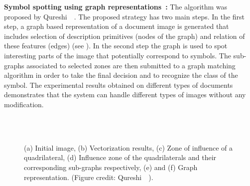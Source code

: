 \textbf{Symbol spotting using graph representations~\cite{Qureshi2007}:} The algorithm was proposed by Qureshi~\etal~\cite{Qureshi2007}. The proposed strategy has two main steps. In the first step, a graph based representation of a document image is generated that includes selection of description primitives (nodes of the graph) and relation of these features (edges) (see ). In the second step the graph is used to spot interesting parts of the image that potentially correspond to symbols. The sub-graphs associated to selected zones are then submitted to a graph matching algorithm in order to take the final decision and to recognize the class of the symbol. The experimental results obtained on different types of documents demonstrates that the system can handle different types of images without any modification.
\begin{figure}[t!]
\begin{center}
\hspace{5mm}
\\
\hspace{2mm}
\hspace{2mm}
\\
\caption{(a) Initial image, (b) Vectorization results, (c) Zone of influence of a quadrilateral, (d) Influence zone of the quadrilaterals and their corresponding sub-graphs respectively, (e) and (f) Graph representation. (Figure credit: Qureshi~\etal~\cite{Qureshi2007}).}
\label{fig:experiments:ssgr}
\end{center}
\end{figure}


